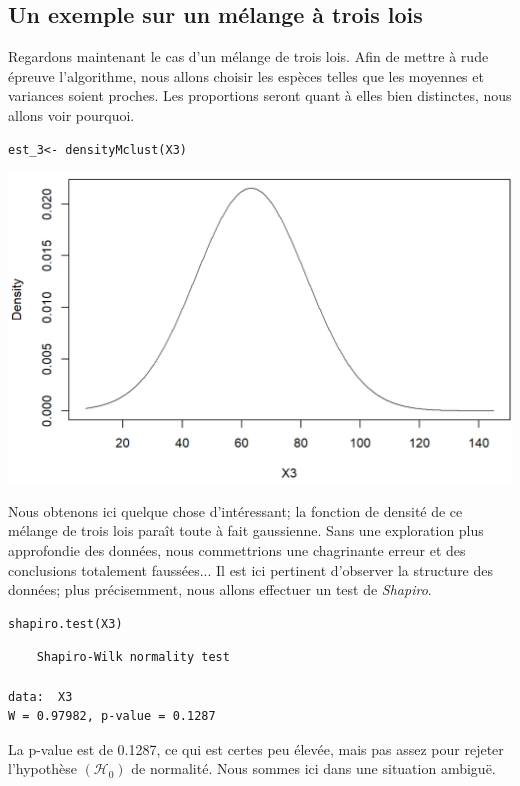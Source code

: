 \documentclass[frenchb]{report}
\newcommand{\1}{\mathbbm{1}}
\theoremstyle{definition}\newtheorem{defn}{Définition}
\theoremstyle{definition}\newtheorem{exm}{Exemple}
\theoremstyle{definition}\newtheorem{nota}{Notation}
\theoremstyle{definition}\newtheorem{rem}{Remarque}
\begin{document}
\begin{appendices}
\section{Un exemple sur un mélange à trois lois}
Regardons maintenant le cas d'un mélange de trois lois. Afin de mettre à rude épreuve l'algorithme, nous allons choisir les espèces telles que les moyennes et variances soient proches. Les proportions seront quant à elles bien distinctes, nous allons voir pourquoi.
%
\begin{lstlisting}
est_3<- densityMclust(X3)
\end{lstlisting}
\begin{center}\includegraphics[scale=0.75]{fig2.png}\end{center}
Nous obtenons ici quelque chose d'intéressant; la fonction de densité de ce mélange de trois lois paraît toute à fait gaussienne. Sans une exploration plus approfondie des données, nous commettrions une chagrinante erreur et des conclusions totalement faussées... \newline
%
Il est ici pertinent d'observer la structure des données; plus précisemment, nous allons effectuer un test de \textit{Shapiro}.
\begin{lstlisting}
shapiro.test(X3)
\end{lstlisting}

\begin{verbatim}
	Shapiro-Wilk normality test

data:  X3
W = 0.97982, p-value = 0.1287
\end{verbatim}
La p-value est de 0.1287, ce qui est certes peu élevée, mais pas assez pour rejeter l'hypothèse $(\mathcal{H}_0)$ de normalité. Nous sommes ici dans une situation ambiguë.\newline
%


\end{appendices}
\end{document}
